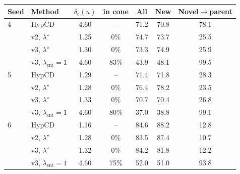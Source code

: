 \begin{tabular}{llccccc}
\toprule
Seed & Method & $\delta_c(u)$ & in cone & All & New & Novel$\to$parent \\
\midrule
4 & HypCD & 4.60 & -- & 71.2 & 70.8 & 78.1 \\
 & v2, $\lambda^\star$ & 1.25 & 0\% & 74.7 & 73.7 & 25.5 \\
 & v3, $\lambda^\star$ & 1.30 & 0\% & 73.3 & 74.9 & 25.9 \\
 & v3, $\lambda_{\mathrm{ent}}{=}1$ & 4.60 & 83\% & 43.9 & 48.1 & 99.5 \\
\midrule
5 & HypCD & 1.29 & -- & 71.4 & 71.8 & 28.3 \\
 & v2, $\lambda^\star$ & 1.28 & 0\% & 76.4 & 78.2 & 23.5 \\
 & v3, $\lambda^\star$ & 1.33 & 0\% & 70.7 & 70.4 & 26.8 \\
 & v3, $\lambda_{\mathrm{ent}}{=}1$ & 4.60 & 80\% & 37.0 & 38.8 & 99.1 \\
\midrule
6 & HypCD & 1.16 & -- & 84.6 & 88.2 & 12.8 \\
 & v2, $\lambda^\star$ & 1.28 & 0\% & 83.5 & 87.4 & 10.7 \\
 & v3, $\lambda^\star$ & 1.32 & 0\% & 84.2 & 81.8 & 12.2 \\
 & v3, $\lambda_{\mathrm{ent}}{=}1$ & 4.60 & 75\% & 52.0 & 51.0 & 93.8 \\
\bottomrule
\end{tabular}
